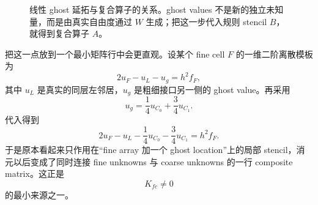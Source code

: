 \begin{figure}[htbp]
\centering
{}
\caption{线性 ghost 延拓与复合算子的关系。ghost values 不是新的独立未知量，而是由真实自由度通过 $W$ 生成；把这一步代入规则 stencil $B$，就得到复合算子 $A$。}
\label{fig:amr-ghost-elimination-operator}
\end{figure}

把这一点放到一个最小矩阵行中会更直观。设某个 fine cell $F$ 的一维二阶离散模板为
\begin{equation}
2u_F-u_L-u_g
=
h^2f_F,
\label{eq:amr-ghost-elimination-small-row}
\end{equation}
其中 $u_L$ 是真实的同层左邻居，$u_g$ 是粗细接口另一侧的 ghost value。再采用
\begin{equation}
u_g
=
\frac14u_{C_0}
+
\frac34u_{C_1}.
\end{equation}
代入得到
\begin{equation}
\boxed{
2u_F-u_L
-\frac14u_{C_0}
-\frac34u_{C_1}
=
h^2f_F.
}
\label{eq:amr-ghost-elimination-small-row-final}
\end{equation}
于是原本看起来只作用在“fine array 加一个 ghost location”上的局部 stencil，消元以后变成了同时连接 fine unknowns 与 coarse unknowns 的一行 composite matrix。这正是
\begin{equation}
K_{fc}\neq0
\end{equation}
的最小来源之一。

